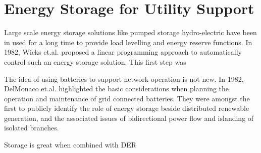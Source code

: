 \section{Energy Storage for Utility Support}
\label{ch-review:sec:energy-storage-for-utility-support}



Large scale energy storage solutions like pumped storage hydro-electric have been in used for a long time to provide load levelling and energy reserve functions. In 1982, Wicks et.al. \cite{Wicks1982} proposed a linear programming approach to automatically control such an energy storage solution. This first step was 

The idea of using batteries to support network operation is not new. In 1982, DelMonaco et.al.\cite{DelMonaco1982} highlighted the basic considerations when planning the operation and maintenance of grid connected batteries. They were amongst the first to publicly identify the role of energy storage beside distributed renewable generation, and the associated issues of bidirectional power flow and islanding of isolated branches. 

Storage is great when combined with DER
\cite{Papathanassiou2006}


